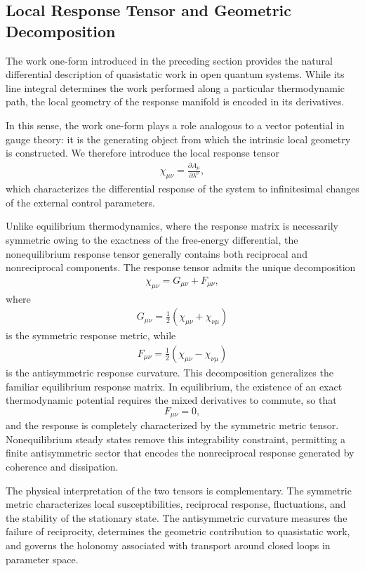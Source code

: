 \subsection{Local Response Tensor and Geometric Decomposition}
The work one-form introduced in the preceding section provides
the natural differential description of quasistatic work in open
quantum systems. While its line integral determines the work
performed along a particular thermodynamic path, the local
geometry of the response manifold is encoded in its derivatives.

In this sense, the work one-form plays a role analogous to a
vector potential in gauge theory: it is the generating object
from which the intrinsic local geometry is constructed.
We therefore introduce the local response tensor
\begin{align}
\chi_{\mu\nu}
=
\frac{\partial A_\mu}
{\partial\lambda^\nu},
\end{align}
which characterizes the differential response of the system to
infinitesimal changes of the external control parameters.

Unlike equilibrium thermodynamics, where the response matrix is
necessarily symmetric owing to the exactness of the free-energy
differential, the nonequilibrium response tensor generally
contains both reciprocal and nonreciprocal components.
The response tensor admits the unique decomposition
\begin{align}
\chi_{\mu\nu}
=
G_{\mu\nu}
+
F_{\mu\nu},
\end{align}
where
\begin{align}
G_{\mu\nu}
=
\frac{1}{2}
\left(
\chi_{\mu\nu}
+
\chi_{\nu\mu}
\right)
\end{align}
is the symmetric response metric, while
\begin{align}
F_{\mu\nu}
=
\frac{1}{2}
\left(
\chi_{\mu\nu}
-
\chi_{\nu\mu}
\right)
\end{align}
is the antisymmetric response curvature.
This decomposition generalizes the familiar equilibrium response
matrix. In equilibrium, the existence of an exact thermodynamic
potential requires the mixed derivatives to commute, so that
\[
F_{\mu\nu}=0,
\]
and the response is completely characterized by the symmetric
metric tensor. Nonequilibrium steady states remove this
integrability constraint, permitting a finite antisymmetric
sector that encodes the nonreciprocal response generated by
coherence and dissipation.

The physical interpretation of the two tensors is
complementary. The symmetric metric characterizes local
susceptibilities, reciprocal response, fluctuations, and the
stability of the stationary state. The antisymmetric curvature
measures the failure of reciprocity, determines the geometric
contribution to quasistatic work, and governs the holonomy
associated with transport around closed loops in parameter space.

